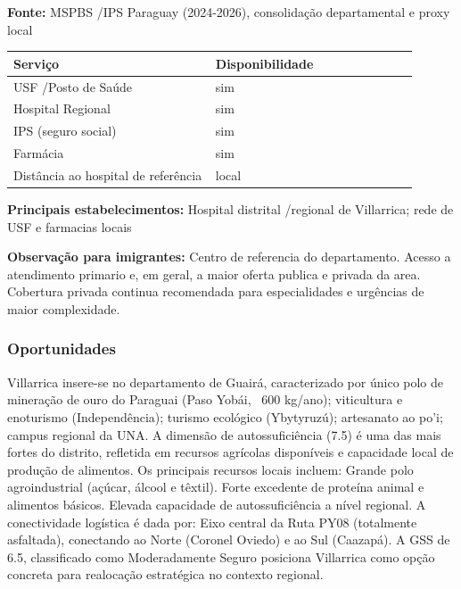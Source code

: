 \textbf{Fonte:} MSPBS /\allowbreak  IPS Paraguay (2024-2026), consolidação
departamental e proxy local

{\def\LTcaptype{none} %
\begin{longtable}{@{}>{\raggedright\arraybackslash}p{0.45\linewidth} >{\raggedright\arraybackslash}p{0.45\linewidth}@{}}
\toprule\noalign{}
Serviço & Disponibilidade \\
\midrule\noalign{}
\endhead
\bottomrule\noalign{}
\endlastfoot
USF /\allowbreak  Posto de Saúde & sim \\
Hospital Regional & sim \\
IPS (seguro social) & sim \\
Farmácia & sim \\
Distância ao hospital de referência & local \\
\end{longtable}
}

\textbf{Principais estabelecimentos:} Hospital distrital /\allowbreak  regional de
Villarrica; rede de USF e farmacias locais

\textbf{Observação para imigrantes:} Centro de referencia do
departamento. Acesso a atendimento primario e, em geral, a maior oferta
publica e privada da area. Cobertura privada continua recomendada para
especialidades e urgências de maior complexidade.
\newpage

\subsubsection*{Oportunidades}\label{oport-villarrica-0401}
Villarrica insere-se no departamento de Guairá, caracterizado por único polo de mineração de ouro do Paraguai (Paso Yobái, ~600 kg/ano); viticultura e enoturismo (Independência); turismo ecológico (Ybytyruzú); artesanato ao po'i; campus regional da UNA. A dimensão de autossuficiência (7.5) é uma das mais fortes do distrito, refletida em recursos agrícolas disponíveis e capacidade local de produção de alimentos. Os principais recursos locais incluem: Grande polo agroindustrial (açúcar, álcool e têxtil). Forte excedente de proteína animal e alimentos básicos. Elevada capacidade de autossuficiência a nível regional. A conectividade logística é dada por: Eixo central da Ruta PY08 (totalmente asfaltada), conectando ao Norte (Coronel Oviedo) e ao Sul (Caazapá). A GSS de 6.5, classificado como Moderadamente Seguro posiciona Villarrica como opção concreta para realocação estratégica no contexto regional.

